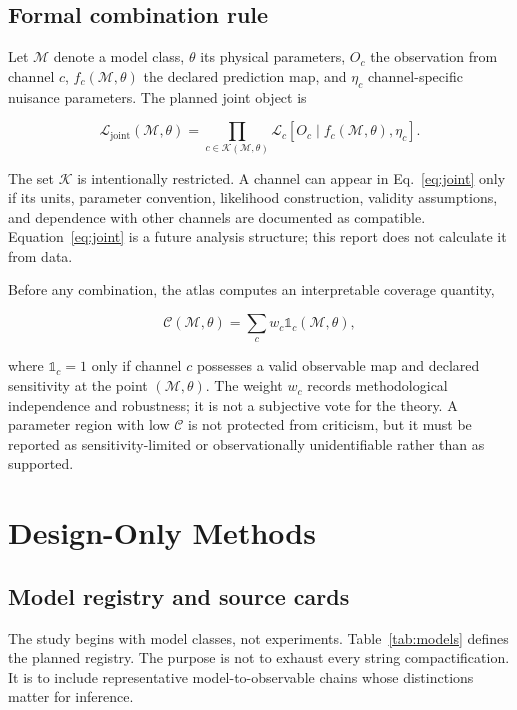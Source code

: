 \documentclass[conference]{IEEEtran}
\newcommand{\model}{\mathcal{M}}
\newcommand{\coverage}{\mathcal{C}}
\newcommand{\ind}{\mathbb{1}}
\begin{document}
\subsection{Formal combination rule}

Let $\model$ denote a model class, $\theta$ its physical parameters, $O_c$ the observation from channel $c$, $f_c(\model,\theta)$ the declared prediction map, and $\eta_c$ channel-specific nuisance parameters. The planned joint object is

\begin{equation}
\mathcal{L}_{\mathrm{joint}}(\model,\theta)=
\prod_{c\in\mathcal{K}(\model,\theta)}
\mathcal{L}_c\left[O_c\mid f_c(\model,\theta),\eta_c\right].
\label{eq:joint}
\end{equation}

The set $\mathcal{K}$ is intentionally restricted. A channel can appear in Eq.~\eqref{eq:joint} only if its units, parameter convention, likelihood construction, validity assumptions, and dependence with other channels are documented as compatible. Equation~\eqref{eq:joint} is a future analysis structure; this report does not calculate it from data.

Before any combination, the atlas computes an interpretable coverage quantity,

\begin{equation}
\coverage(\model,\theta)=\sum_c w_c\ind_c(\model,\theta),
\label{eq:coverage}
\end{equation}

where $\ind_c=1$ only if channel $c$ possesses a valid observable map and declared sensitivity at the point $(\model,\theta)$. The weight $w_c$ records methodological independence and robustness; it is not a subjective vote for the theory. A parameter region with low $\coverage$ is not protected from criticism, but it must be reported as sensitivity-limited or observationally unidentifiable rather than as supported.

\section{Design-Only Methods}

\subsection{Model registry and source cards}

The study begins with model classes, not experiments. Table~\ref{tab:models} defines the planned registry. The purpose is not to exhaust every string compactification. It is to include representative model-to-observable chains whose distinctions matter for inference.
\end{document}
